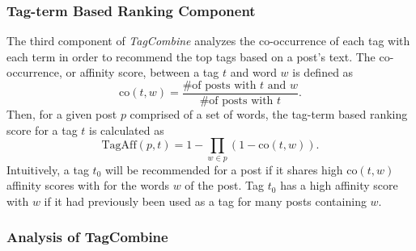 \documentclass[10pt]{IEEEtran}
\begin{document}
\subsubsection{Tag-term Based Ranking Component}

The third component of \textit{TagCombine} analyzes the co-occurrence of each tag with each term in order to recommend the top tags based on a post’s text. The co-occurrence, or affinity score, between a tag $t$ and word $w$ is defined as
\[ \text{co}(t, w) = \frac{\text{\# of posts with }t\text{ and }w}{\text{\# of posts with }t}. \]
Then, for a given post $p$ comprised of a set of words, the tag-term based ranking score for a tag $t$ is calculated as
\[ \text{TagAff}(p, t) = 1 - \prod_{w \in p}(1 - \text{co}(t, w)). \]
Intuitively, a tag $t_0$ will be recommended for a post if it shares high $\text{co}(t, w)$ affinity scores with for the words $w$ of the post. Tag $t_0$ has a high affinity score with $w$ if it had previously been used as a tag for many posts containing $w$.

\subsubsection{Analysis of TagCombine}
\end{document}
